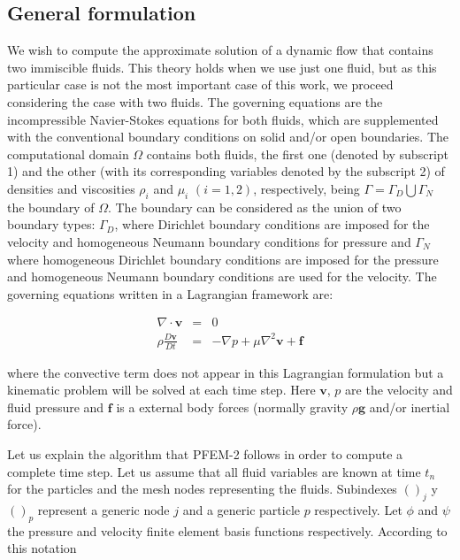 \subsection{General formulation}\label{GeneralFor}
We wish to compute the approximate solution of a dynamic flow that contains two immiscible fluids. This theory holds when we use just one fluid, but as this particular case is not the most important case of this work, we proceed considering the case with two fluids. The governing equations are the incompressible Navier-Stokes equations for both fluids, which are supplemented with the conventional boundary conditions on solid and/or open boundaries. The computational domain $\Omega$ contains both fluids, the first one (denoted by subscript 1) and the other (with its corresponding variables denoted by the subscript 2) of densities and viscosities $\rho_i$ and $\mu_i$ $(i=1,2)$, respectively, being $\Gamma=\Gamma_D\bigcup\Gamma_N$ the boundary of $\Omega$. The boundary can be considered as the union of two boundary types: $\Gamma_D$, where Dirichlet boundary conditions are imposed for the velocity and homogeneous Neumann boundary conditions for pressure and $\Gamma_N$ where homogeneous Dirichlet boundary
conditions are imposed for the pressure and homogeneous Neumann boundary conditions are used for the velocity. The governing equations written in a Lagrangian framework are:

\begin{eqnarray}
  \nabla \cdot \mathbf{v} &=& 0 \\
  \rho\frac{D\mathbf{v}}{Dt} &=& -\nabla p + \mu \nabla^2 \mathbf{v} + \mathbf{f}
\end{eqnarray}

where the convective term does not appear in this Lagrangian formulation but a kinematic problem will be solved at each time step. Here $\mathbf{v}$, $p$ are the velocity and fluid pressure and $\mathbf{f}$ is a external body forces (normally gravity $\rho \mathbf{g}$ and/or inertial force).

Let us explain the algorithm that PFEM-2 follows in order to compute a complete time step. Let us assume that all fluid variables are known at time $t_n$ for the particles and the mesh nodes representing the fluids. Subindexes $()_j$ y $()_p$ represent a generic node $j$ and a generic particle $p$ respectively. Let $\phi$ and $\psi$ the pressure and velocity finite element basis functions respectively. According to this notation

